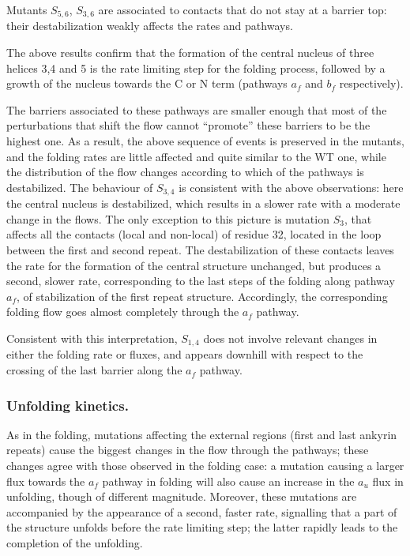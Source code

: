 Mutants $S_{5,6}$, $S_{3,6}$ %
are associated to contacts that do not stay at  a barrier top: their
destabilization weakly affects the rates and pathways.

The above results confirm that %
the formation of the central nucleus
of three helices 3,4 and 5 is the rate limiting step for the folding process,
followed by a growth of the nucleus towards
the C or N term (pathways $a_f$ and $b_f$ respectively). 

The barriers associated to these pathways are smaller enough
that most of the perturbations that shift the flow cannot ``promote''
these barriers to be the highest one. 
As a result,  the above sequence of
events is preserved in the mutants, and the folding rates are little affected
and quite similar to the WT one, while the distribution of the flow changes
according to which of the pathways is destabilized. The behaviour of $S_{3,4}$
is consistent with the above observations: here the central nucleus is
destabilized, which results in a slower rate with a moderate change in the
flows. The only exception to this picture is mutation $S_3$, that affects all
the contacts (local and non-local) of residue 32, located in the loop between
the first and second repeat. The destabilization of these contacts  leaves the
rate for the formation of the central structure unchanged, but produces a
second, slower rate, corresponding to the last steps of the  folding along pathway $a_f$, of
stabilization of the first repeat structure. Accordingly, the
corresponding folding flow goes almost completely through the $a_f$ pathway.

Consistent with this interpretation, $S_{1,4}$ does not involve relevant changes
in either the folding rate or fluxes, and  appears downhill with respect to the
crossing of the last barrier along the $a_f$ pathway.


\subsubsection{Unfolding kinetics.}

As in the folding, mutations affecting the external regions (first and last
ankyrin repeats) cause the biggest changes in the flow through the pathways;
these changes agree with those observed in the folding case: a mutation causing
a larger flux towards the $a_f$ pathway in folding will also cause an increase
in the $a_u$ flux in unfolding, though of different magnitude. Moreover, these
mutations  are accompanied by the appearance of a second, faster rate,
signalling that a part of the structure unfolds before the rate limiting step;
the latter rapidly leads  to the completion of the unfolding.

